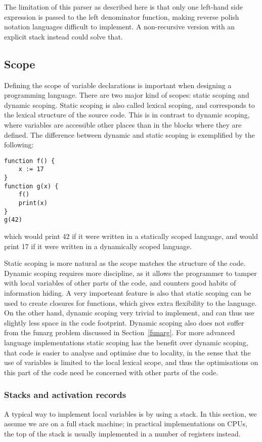 \documentclass[11pt]{report}
\begin{document}
The limitation of this parser as described here is that only one left-hand side expression is passed to the left denominator function, making reverse polish notation languages difficult to implement. A non-recursive version with an explicit stack instead could solve that.

\subsection{Scope}
Defining the scope of variable declarations  is important when designing a programming language.
There are two major kind of scopes: static scoping and dynamic scoping.
Static scoping is also called lexical scoping, and corresponds to the lexical structure of the source code.
This is in contrast to dynamic scoping, where variables are accessible other places than in the blocks where they are defined. 
The difference between dynamic and static scoping is exemplified by the following:
\begin{verbatim}
function f() {
    x := 17
}
function g(x) {
    f()
    print(x)
}
g(42)
\end{verbatim}
which would print 42 if it were written in a statically scoped language, and would print 17 if it were written in a dynamically scoped language.

Static scoping is more natural as the scope matches the structure of the code. Dynamic scoping requires more discipline, as it allows the programmer to tamper with local variables of other parts of the code, and counters good habits of information hiding. A very importeant feature is also that static scoping can be used to create closures for functions, which gives extra flexibility to the language.
On the other hand, dynamic scoping very trivial to implement, and can thus use slightly less space in the code footprint. Dynamic scoping also does not suffer from the funarg problem discussed in Section~\ref{funarg}.
For more advanced language implementations static scoping has the benefit over dynamic scoping, that code is easier to analyse and optimise due to locality, in the sense that the use of variables is limited to the local lexical scope, and thus the optimisations on this part of the code need be concerned with other parts of the code.

\subsubsection{Stacks and activation records}
A typical way to implement local variables is by using a stack.
In this section, we assume we are on a full stack machine; 
in practical implementations on CPUs, the top of the stack is usually implemented in a number of registers instead.
\end{document}

